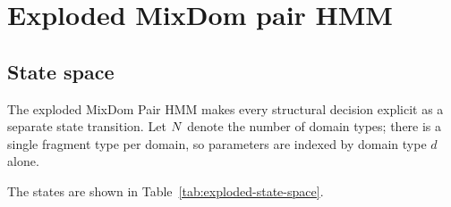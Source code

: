 \documentclass{article}
\begin{document}
\section{Exploded MixDom pair HMM}
\label{appendix:exploded-mixdom}

\subsection{State space}

The exploded MixDom Pair HMM makes every structural decision explicit
as a separate state transition. Let $N$ denote the number of domain
types; there is a single fragment type per domain, so parameters are indexed
by domain type $d$ alone.

The states are shown in Table~\ref{tab:exploded-state-space}.
\end{document}
